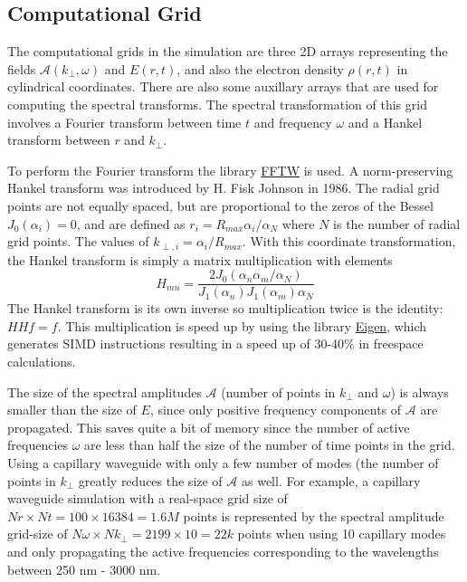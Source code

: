 \documentclass{article}
\begin{document}
\subsection{Computational Grid}
The computational grids in the simulation are three 2D arrays
representing the fields $\mathcal{A}(k_\perp,\omega)$ and $E(r,t)$,
and also the electron density $\rho(r,t)$ in cylindrical coordinates.
There are also some auxillary arrays that are used for computing the
spectral transforms. The spectral transformation of this grid involves a Fourier transform
between time $t$ and frequency $\omega$ and a Hankel transform between
$r$ and $k_\perp$.

To perform the Fourier transform the library
\href{http://fftw.org/}{FFTW} is used. A norm-preserving Hankel
transform was introduced by H. Fisk Johnson in 1986. The radial grid
points are not equally spaced, but are proportional to the zeros of
the Bessel $J_0(\alpha_i) = 0$, and are defined as
$r_i = R_{max} \alpha_i / \alpha_N$ where $N$ is the number of radial
grid points. The values of $k_{\perp,i} = \alpha_i / R_{max}$. With
this coordinate transformation, the Hankel transform is simply a
matrix multiplication with elements
\[H_{mn} = \frac{2J_0(\alpha_n\alpha_m /
    \alpha_N)}{J_1(\alpha_n)J_1(\alpha_m) \alpha_N}\]
%
The Hankel transform is its own inverse so multiplication twice is the
identity: $H H f = f$. This multiplication is speed up by using the
library
\href{http://eigen.tuxfamily.org/index.php?title=Main_Page}{Eigen},
which generates SIMD instructions resulting in a speed up of 30-40\%
in freespace calculations.

The size of the spectral amplitudes $\mathcal{A}$ (number of points in
$k_\perp$ and $\omega$) is always smaller than the size of $E$, since
only positive frequency components of $\mathcal{A}$ are
propagated. This saves quite a bit of memory since the number of
active frequencies $\omega$ are less than half the size of the number
of time points in the grid. Using a capillary waveguide with only a
few number of modes (the number of points in $k_\perp$ greatly reduces
the size of $\mathcal{A}$ as well.  For example, a capillary waveguide
simulation with a real-space grid size of
$Nr\times Nt = 100 \times 16384 = 1.6M$ points is represented by the
spectral amplitude grid-size of
$N\omega\times Nk_\perp = 2199\times 10 = 22k$ points when using 10
capillary modes and only propagating the active frequencies
corresponding to the wavelengths between 250 nm - 3000 nm.
\end{document}
